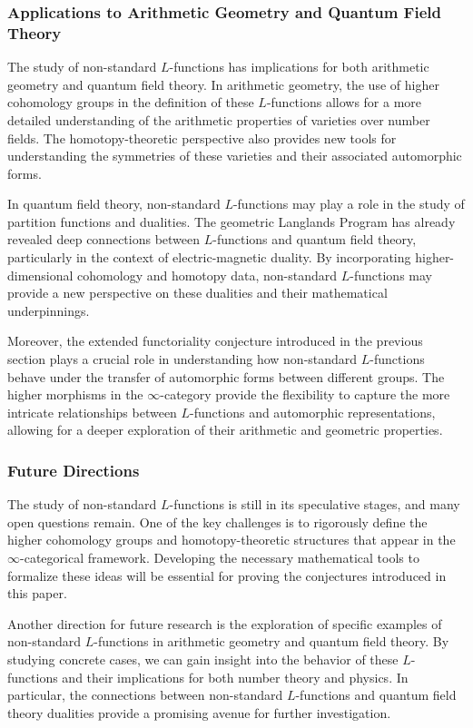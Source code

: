 \documentclass{article}
\theoremstyle{remark}
\begin{document}
\subsubsection{Applications to Arithmetic Geometry and Quantum Field Theory}

The study of non-standard $L$-functions has implications for both arithmetic geometry and quantum field theory. In arithmetic geometry, the use of higher cohomology groups in the definition of these $L$-functions allows for a more detailed understanding of the arithmetic properties of varieties over number fields. The homotopy-theoretic perspective also provides new tools for understanding the symmetries of these varieties and their associated automorphic forms.

In quantum field theory, non-standard $L$-functions may play a role in the study of partition functions and dualities. The geometric Langlands Program has already revealed deep connections between $L$-functions and quantum field theory, particularly in the context of electric-magnetic duality. By incorporating higher-dimensional cohomology and homotopy data, non-standard $L$-functions may provide a new perspective on these dualities and their mathematical underpinnings.

Moreover, the extended functoriality conjecture introduced in the previous section plays a crucial role in understanding how non-standard $L$-functions behave under the transfer of automorphic forms between different groups. The higher morphisms in the $\infty$-category provide the flexibility to capture the more intricate relationships between $L$-functions and automorphic representations, allowing for a deeper exploration of their arithmetic and geometric properties.

\subsubsection{Future Directions}

The study of non-standard $L$-functions is still in its speculative stages, and many open questions remain. One of the key challenges is to rigorously define the higher cohomology groups and homotopy-theoretic structures that appear in the $\infty$-categorical framework. Developing the necessary mathematical tools to formalize these ideas will be essential for proving the conjectures introduced in this paper.

Another direction for future research is the exploration of specific examples of non-standard $L$-functions in arithmetic geometry and quantum field theory. By studying concrete cases, we can gain insight into the behavior of these $L$-functions and their implications for both number theory and physics. In particular, the connections between non-standard $L$-functions and quantum field theory dualities provide a promising avenue for further investigation.
\end{document}
